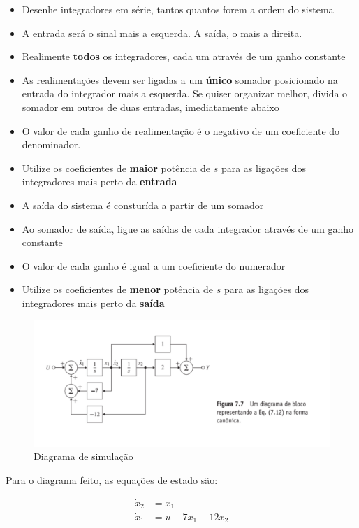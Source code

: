 \documentclass[
]{book}
\providecommand{\tightlist}{%
  \setlength{\itemsep}{0pt}\setlength{\parskip}{0pt}}
\begin{document}
\begin{itemize}
\tightlist
\item
  Desenhe integradores em série, tantos quantos forem a ordem do sistema
\item
  A entrada será o sinal mais a esquerda. A saída, o mais a direita.
\item
  Realimente \textbf{todos} os integradores, cada um através de um ganho constante
\item
  As realimentações devem ser ligadas a um \textbf{único} somador posicionado na entrada do integrador mais a esquerda. Se quiser organizar melhor, divida o somador em outros de duas entradas, imediatamente abaixo
\item
  O valor de cada ganho de realimentação é o negativo de um coeficiente do denominador.
\item
  Utilize os coeficientes de \textbf{maior} potência de \(s\) para as ligações dos integradores mais perto da \textbf{entrada}
\item
  A saída do sistema é consturída a partir de um somador
\item
  Ao somador de saída, ligue as saídas de cada integrador através de um ganho constante
\item
  O valor de cada ganho é igual a um coeficiente do numerador
\item
  Utilize os coeficientes de \textbf{menor} potência de \(s\) para as ligações dos integradores mais perto da \textbf{saída}
\end{itemize}

\begin{figure}
\includegraphics[width=1\linewidth]{./figs/Fig7.7} \caption{Diagrama de simulação}\label{fig:unnamed-chunk-8}
\end{figure}

Para o diagrama feito, as equações de estado são:

\[
\begin{aligned}
    \dot{x}_2&=x_{1}\\\dot{x}_1&=u - 7 x_{1} - 12 x_{2} 
\end{aligned}
\]
\end{document}
